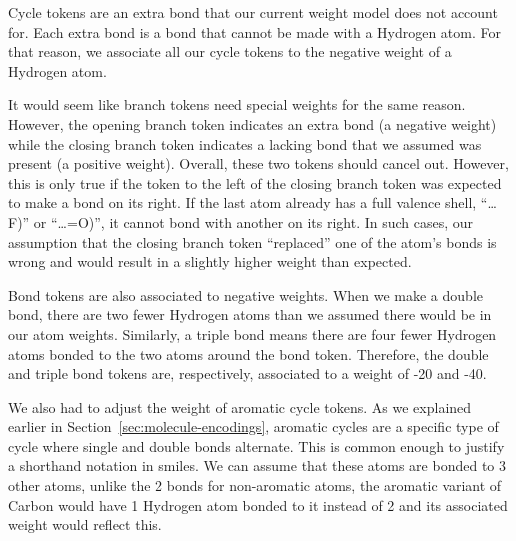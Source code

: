 \documentclass[../Document.tex]{subfiles}
\begin{document}
Cycle tokens are an extra bond that our current weight model does not account for.
Each extra bond is a bond that cannot be made with a Hydrogen atom.
For that reason, we associate all our cycle tokens to the negative weight of a Hydrogen atom.

It would seem like branch tokens need special weights for the same reason.
However, the opening branch token indicates an extra bond (\ie a negative weight) while the closing branch token indicates a lacking bond that we assumed was present (\ie a positive weight).
Overall, these two tokens should cancel out. However, this is only true if the token to the left of the closing branch token was expected to make a bond on its right. If the last atom already has a full valence shell, \eg ``\ldots F)'' or ``\ldots =O)'', it cannot bond with another on its right. In such cases, our assumption that the closing branch token ``replaced'' one of the atom's bonds is wrong and would result in a slightly higher weight than expected.

Bond tokens are also associated to negative weights.
When we make a double bond, there are two fewer Hydrogen atoms than we assumed there would be in our atom weights.
Similarly, a triple bond means there are four fewer Hydrogen atoms bonded to the two atoms around the bond token.
Therefore, the double and triple bond tokens are, respectively, associated to a weight of -20 and -40.

We also had to adjust the weight of aromatic cycle tokens.
As we explained earlier in Section~\ref{sec:molecule-encodings}, aromatic cycles are a specific type of cycle where single and double bonds alternate.
This is common enough to justify a shorthand notation in \gls{smiles}.
We can assume that these atoms are bonded to 3 other atoms, unlike the 2 bonds for non-aromatic atoms, \eg the aromatic variant of Carbon would have 1 Hydrogen atom bonded to it instead of 2 and its associated weight would reflect this.


\end{document}
